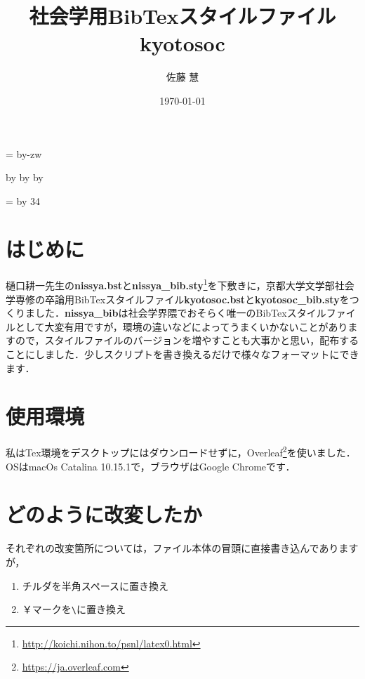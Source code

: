 \documentclass[b5paper, titlepage, 11pt]{jsarticle}
\title{社会学用BibTexスタイルファイルkyotosoc}
\author{佐藤 慧}
\date{\today}
\makeatletter
\def\mojiparline#1{
    \newcounter{mpl}
    \setcounter{mpl}{#1}
    \@tempdima=\linewidth
    \advance\@tempdima by-\value{mpl}zw
    \addtocounter{mpl}{-1}
    \divide\@tempdima by \value{mpl}
    \advance\kanjiskip by\@tempdima
    \advance\parindent by\@tempdima
}
\def\linesparpage#1{
    \baselineskip=\textheight
    \divide\baselineskip by #1
}
\makeatother
\begin{document}
\maketitle

\setcounter{tocdepth}{2}
\tableofcontents

\mojiparline{35}
\linesparpage{34}

\section{はじめに}
樋口耕一先生の\textbf{nissya.bst}と\textbf{nissya\_bib.sty}\footnote{\url{http://koichi.nihon.to/psnl/latex0.html}}を下敷きに，京都大学文学部社会学専修の卒論用BibTexスタイルファイル\textbf{kyotosoc.bst}と\textbf{kyotosoc\_bib.sty}をつくりました．\textbf{nissya\_bib}は社会学界隈でおそらく唯一のBibTexスタイルファイルとして大変有用ですが，環境の違いなどによってうまくいかないことがありますので，スタイルファイルのバージョンを増やすことも大事かと思い，配布することにしました．少しスクリプトを書き換えるだけで様々なフォーマットにできます．



\section{使用環境}
私はTex環境をデスクトップにはダウンロードせずに，Overleaf\footnote{\url{https://ja.overleaf.com}}を使いました．OSはmacOs Catalina 10.15.1で，ブラウザはGoogle Chromeです．

\section{どのように改変したか}
それぞれの改変箇所については，ファイル本体の冒頭に直接書き込んでありますが，

\begin{enumerate}
    \item チルダを半角スペースに置き換え
    \item ￥マークを\verb|\|に置き換え
\end{enumerate}
\end{document}

